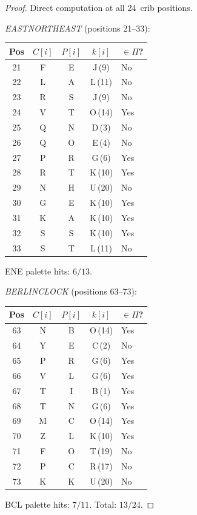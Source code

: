 \documentclass[11pt]{article}
\theoremstyle{remark}
\begin{document}
\begin{proof}
Direct computation at all 24~crib positions.

\medskip
\noindent\textit{EASTNORTHEAST} (positions 21--33):
\begin{center}
\begin{tabular}{ccccl}
\toprule
Pos & $C[i]$ & $P[i]$ & $k[i]$ & $\in \Pi$? \\
\midrule
21 & F & E & J\,(9)  & No \\
22 & L & A & L\,(11) & No \\
23 & R & S & J\,(9)  & No \\
24 & V & T & O\,(14) & Yes \\
25 & Q & N & D\,(3)  & No \\
26 & Q & O & E\,(4)  & No \\
27 & P & R & G\,(6)  & Yes \\
28 & R & T & K\,(10) & Yes \\
29 & N & H & U\,(20) & No \\
30 & G & E & K\,(10) & Yes \\
31 & K & A & K\,(10) & Yes \\
32 & S & S & K\,(10) & Yes \\
33 & S & T & L\,(11) & No \\
\bottomrule
\end{tabular}
\end{center}
ENE palette hits: $6/13$.

\medskip
\noindent\textit{BERLINCLOCK} (positions 63--73):
\begin{center}
\begin{tabular}{ccccl}
\toprule
Pos & $C[i]$ & $P[i]$ & $k[i]$ & $\in \Pi$? \\
\midrule
63 & N & B & O\,(14) & Yes \\
64 & Y & E & C\,(2)  & No \\
65 & P & R & G\,(6)  & Yes \\
66 & V & L & G\,(6)  & Yes \\
67 & T & I & B\,(1)  & Yes \\
68 & T & N & G\,(6)  & Yes \\
69 & M & C & O\,(14) & Yes \\
70 & Z & L & K\,(10) & Yes \\
71 & F & O & T\,(19) & No \\
72 & P & C & R\,(17) & No \\
73 & K & K & U\,(20) & No \\
\bottomrule
\end{tabular}
\end{center}
BCL palette hits: $7/11$.  Total: $13/24$.
\end{proof}
\end{document}

